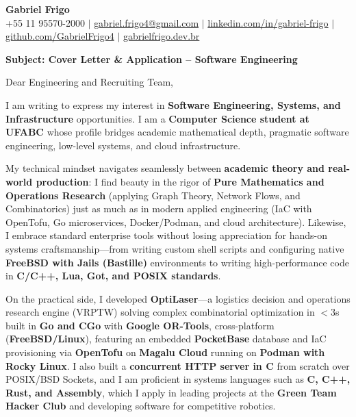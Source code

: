 \documentclass[letterpaper,10pt]{article}
\begin{document}
\begin{center}
  \textbf{\Huge Gabriel Frigo} \\ \vspace{4pt}
  \small +55 11 95570-2000 $|$ \href{mailto:gabriel.frigo4@gmail.com}{gabriel.frigo4@gmail.com} $|$
  \href{https://linkedin.com/in/gabriel-frigo-b6727b275/}{linkedin.com/in/gabriel-frigo} $|$
  \href{https://github.com/GabrielFrigo4}{github.com/GabrielFrigo4} $|$
  \href{https://gabrielfrigo.dev.br}{gabrielfrigo.dev.br}
\end{center}

\vspace{6pt}

\textbf{Subject: Cover Letter \& Application -- Software Engineering}

Dear Engineering and Recruiting Team,

I am writing to express my interest in \textbf{Software Engineering, Systems, and Infrastructure} opportunities. I am a \textbf{Computer Science student at UFABC} whose profile bridges academic mathematical depth, pragmatic software engineering, low-level systems, and cloud infrastructure.

My technical mindset navigates seamlessly between \textbf{academic theory and real-world production}: I find beauty in the rigor of \textbf{Pure Mathematics and Operations Research} (applying Graph Theory, Network Flows, and Combinatorics) just as much as in modern applied engineering (IaC with OpenTofu, Go microservices, Docker/Podman, and cloud architecture). Likewise, I embrace standard enterprise tools without losing appreciation for hands-on systems craftsmanship---from writing custom shell scripts and configuring native \textbf{FreeBSD with Jails (Bastille)} environments to writing high-performance code in \textbf{C/C++, Lua, Got, and POSIX standards}.

On the practical side, I developed \textbf{OptiLaser}---a logistics decision and operations research engine (VRPTW) solving complex combinatorial optimization in $<3$s built in \textbf{Go and CGo} with \textbf{Google OR-Tools}, cross-platform (\textbf{FreeBSD/Linux}), featuring an embedded \textbf{PocketBase} database and IaC provisioning via \textbf{OpenTofu} on \textbf{Magalu Cloud} running on \textbf{Podman with Rocky Linux}. I also built a \textbf{concurrent HTTP server in C} from scratch over POSIX/BSD Sockets, and I am proficient in systems languages such as \textbf{C, C++, Rust, and Assembly}, which I apply in leading projects at the \textbf{Green Team Hacker Club} and developing software for competitive robotics.
\end{document}
